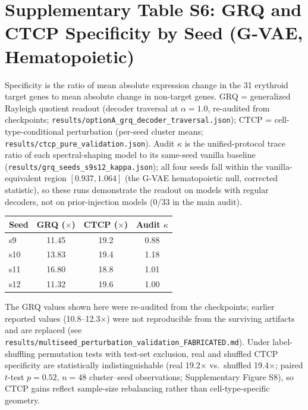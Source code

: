\documentclass[11pt,a4paper]{article}
\begin{document}
\section*{Supplementary Table S6: GRQ and CTCP Specificity by Seed (G-VAE, Hematopoietic)}
\label{tab:s6_seed_kappa}

Specificity is the ratio of mean absolute expression change in the 31 erythroid target genes to mean absolute change in non-target genes. GRQ = generalized Rayleigh quotient readout (decoder traversal at $\alpha=1.0$, re-audited from checkpoints; \texttt{results/optionA\_grq\_decoder\_traversal.json}); CTCP = cell-type-conditional perturbation (per-seed cluster means; \texttt{results/ctcp\_pure\_validation.json}). Audit $\kappa$ is the unified-protocol trace ratio of each spectral-shaping model to its same-seed vanilla baseline (\texttt{results/grq\_seeds\_s9s12\_kappa.json}); all four seeds fall within the vanilla-equivalent region $[0.937,1.064]$ (the G-VAE hematopoietic null, corrected statistic), so these runs demonstrate the readout on models with regular decoders, not on prior-injection models (0/33 in the main audit).

\begin{center}
\begin{tabular}{lccc}
\toprule
\textbf{Seed} & \textbf{GRQ ($\times$)} & \textbf{CTCP ($\times$)} & \textbf{Audit $\kappa$} \\
\midrule
s9  & 11.45 & 19.2 & 0.88 \\
s10 & 13.83 & 19.4 & 1.18 \\
s11 & 16.80 & 18.8 & 1.01 \\
s12 & 11.32 & 19.6 & 1.00 \\
\bottomrule
\end{tabular}
\end{center}

The GRQ values shown here were re-audited from the checkpoints; earlier reported values (10.8--12.3$\times$) were not reproducible from the surviving artifacts and are replaced (see \texttt{results/multiseed\_perturbation\_validation\_FABRICATED.md}). Under label-shuffling permutation tests with test-set exclusion, real and shuffled CTCP specificity are statistically indistinguishable (real 19.2$\times$ vs.\ shuffled 19.4$\times$; paired $t$-test $p=0.52$, $n=48$ cluster--seed observations; Supplementary Figure S8), so CTCP gains reflect sample-size rebalancing rather than cell-type-specific geometry.
\end{document}
